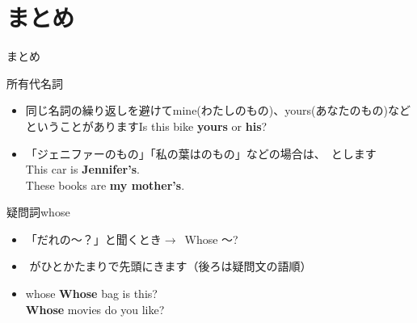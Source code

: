 \documentclass[aspectratio=169,xcolor={dvipsnames,table}]{beamer}
\begin{document}
\section{まとめ}
\begin{frame}[plain]{まとめ}
 \begin{exampleblock}{所有代名詞}
\begin{itemize}[square]\small
 \item 同じ名詞の繰り返しを避けてmine(わたしのもの)、yours(あなたのもの)などということがあります\hfill{\scriptsize Is this bike {\bfseries yours} or {\bfseries his}?}
 \item 「ジェニファーのもの」「私の葉はのもの」などの場合は、
\,とします\\
\hfill{\scriptsize This car is {\bfseries Jennifer's}.}\\
\hfill{\scriptsize These books are {\bfseries my mother's}.}
\end{itemize}
     \end{exampleblock}

\begin{exampleblock}{疑問詞whose }
\begin{itemize}[square]\small
 \item 「だれの～？」と聞くとき$\longrightarrow$\,\,\,Whose 〜?
 \item  {}\,\,がひとかたまりで先頭にきます（後ろは疑問文の語順）
 \item whose \hfill{\scriptsize {\bfseries Whose} bag is this?}\\\hfill{\scriptsize {\bfseries Whose} movies do you like?}
\end{itemize}
     \end{exampleblock}
\hfill{\scriptsize {}}

\end{frame}
\end{document}
